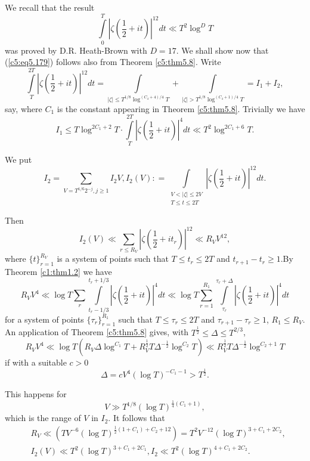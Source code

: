 We recall that the result
\begin{equation}
\int\limits^T_0 \left|\zeta \left(\frac{1}{2} + it \right)\right|^{12}
dt \ll T^2 \log^D T \label{c5:eq5.179} 
\end{equation}
was proved by D.R. Heath-Brown with $D = 17$. We shall show now that
(\ref{c5:eq5.179}) follows also from Theorem \ref{c5:thm5.8}. Write 
$$ 
\int\limits^{2T}_T \left|\zeta \left(\frac{1}{2} + it
\right)\right|^{12} dt = \int\limits_{|\zeta| \leq T^{1/8}
  \log^{(C_4+4)/4} T} + \int\limits_{|\zeta| > T^{1/8}
  \log^{(C_4+1)/4} T} =  I_1 + I_2,  
$$
say, where $C_1$ is the constant appearing in Theorem
\ref{c5:thm5.8}. Trivially we have  
$$
I_1 \leq T \log^{2C_1 + 2} T \cdot \int\limits^{2T}_T \left|\zeta
\left(\frac{1}{2} + it \right)\right|^4 dt \ll T^2 \log^{2C_1 + 6} T. 
$$

We put 
$$ 
I_2 = \sum\limits_{V = T^{1/6} 2^{-j} , j \geq 1}  I_2 V , I_2 (V) : =
\int\limits_{\substack{V < |\zeta| \leq 2 V\\T \leq t \leq 2T}}\left|\zeta
\left(\frac{1}{2} + it \right)\right|^{12} dt.  
$$

Then 
$$
I_2 (V) \ll \sum\limits_{r \leq R_V} \left|\zeta \left(\frac{1}{2} + it_r
\right)\right|^{12} \ll R_V V^{12}, 
$$
where $\{t\}^{R_V}_{r=1}$ is a system of points such that $T \leq t_r
\leq 2T$ and $t_{r+1} - t_r \geq 1$.\pageoriginale By Theorem
\ref{c1:thm1.2} we have  
$$
R_V  V^4 \ll \log T \sum\limits_r \int\limits^{t_r + 1/3}_{t_r -1/3}
\left|\zeta \left(\frac{1}{2} + it \right)\right|^4  dt \ll \log T
\sum\limits^{R_1}_{r=1} \int\limits^{\tau_r + \Delta}_{\tau_r} \left|\zeta
\left(\frac{1}{2} + it \right)\right|^4 dt 
$$
for a system of points $\{\tau_r\}^{R_1}_{r=1}$ such that $T \leq
\tau_r \leq 2T$ and $\tau_{r+1} - \tau_r \geq 1$, $R_1 \leq R_V$. An
application of Theorem \ref{c5:thm5.8} gives, with $T^{\frac{1}{2}}
\leq \Delta \leq T^{2/3}$, 
$$
R_V V^4 \ll \log T \left(R_V \Delta \log^{C_1} T + R^{\frac{1}{2}}_V T
\Delta^{-\frac{1}{2}} \log^{C_2} T\right)  \ll R^{\frac{1}{2}}_V T
\Delta^{-\frac{1}{2}} \log^{C_2+1} T 
$$
if with a suitable $c >0$
$$
\Delta = c V^4 (\log T)^{-C_1 -1} > T^{\frac{1}{2}}. 
$$

This happens for 
$$
V \gg T^{1/8} (\log T)^{\frac{1}{4} (C_1+ 1)},
$$
which is the range of $V$ in $I_2$. It follows that
\begin{align*}
& R_V \ll \left(TV^{-6} (\log T)^{\frac{1}{2} (1+C_1) + C_2 + 1 2}
  \right) = T^2 V^{-12} (\log T)^{3+C_1+2C_2},\\ 
& I_2 (V) \ll T^2 (\log T)^{3+C_1+2C_1}, I_2 \ll T^2 (\log T)^{4+C_1
    +2C_2}. 
\end{align*}

